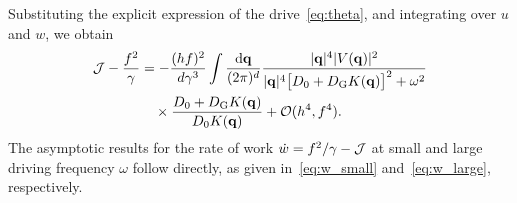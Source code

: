 \documentclass[pre, superscriptaddress, twocolumn,pre]{revtex4-1}
\begin{document}
Substituting the explicit expression of the drive~\eqref{eq:theta}, and integrating over $u$ and $w$, we obtain
\begin{equation}
	\begin{aligned}
		{\cal J} - \frac{f^2}{\gamma} &= - \frac{(hf)^2}{d\gamma^3} \int \frac{{\rm d}{\bf q}}{(2\pi)^d} \frac{|{\bf q}|^4 |V({\bf q})|^2}{|{\bf q}|^4\big[D_0+D_{\rm G}K({\bf q})\big]^2 + \omega^2}
		\\
		&\quad\times \frac{D_0+D_{\rm G}K({\bf q})}{D_0K({\bf q})} + {\cal O}(h^4,f^4) .
	\end{aligned}
\end{equation}
The asymptotic results for the rate of work $\dot w = f^2/\gamma-{\cal J}$ at small and large driving frequency $\omega$ follow directly, as given in~\eqref{eq:w_small} and~\eqref{eq:w_large}, respectively.
\end{document}
